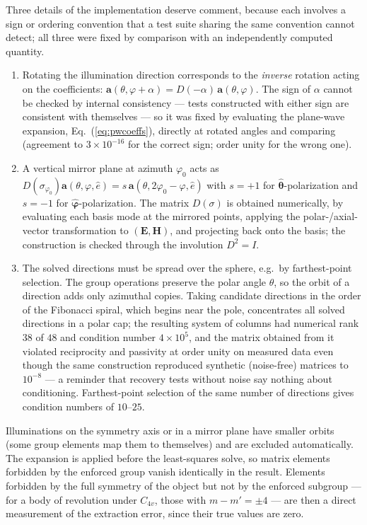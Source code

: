\documentclass[11pt]{article}
\newcommand{\EE}{\mathbf{E}}
\newcommand{\HH}{\mathbf{H}}
\newcommand{\thhat}{\hat{\boldsymbol{\theta}}}
\newcommand{\phhat}{\hat{\boldsymbol{\varphi}}}
\begin{document}
Three details of the implementation deserve comment, because each
involves a sign or ordering convention that a test suite sharing the
same convention cannot detect; all three were fixed by comparison with
an independently computed quantity.
\begin{enumerate}
\item Rotating the illumination direction corresponds to the
\emph{inverse} rotation acting on the coefficients:
$\mathbf{a}(\theta, \varphi + \alpha) = D(-\alpha)\,
\mathbf{a}(\theta, \varphi)$.  The sign of $\alpha$ cannot be checked
by internal consistency --- tests constructed with either sign are
consistent with themselves --- so it was fixed by evaluating the
plane-wave expansion, Eq.~(\ref{eq:pwcoeffs}), directly at rotated
angles and comparing (agreement to $3\times 10^{-16}$ for the correct
sign; order unity for the wrong one).
\item A vertical mirror plane at azimuth $\varphi_0$ acts as
$D(\sigma_{\varphi_0})\mathbf{a}(\theta,\varphi,\hat{e}) = s\,
\mathbf{a}(\theta, 2\varphi_0 - \varphi, \hat{e})$ with $s = +1$ for
$\thhat$-polarization and $s = -1$ for $\phhat$-polarization.  The
matrix $D(\sigma)$ is obtained numerically, by evaluating each basis
mode at the mirrored points, applying the polar-/axial-vector
transformation to $(\EE, \HH)$, and projecting back onto the basis;
the construction is checked through the involution $D^2 = I$.
\item The solved directions must be spread over the sphere, e.g.\ by
farthest-point selection.  The group operations preserve the polar
angle $\theta$, so the orbit of a direction adds only azimuthal
copies.  Taking candidate directions in the order of the Fibonacci
spiral, which begins near the pole, concentrates all solved directions
in a polar cap; the resulting system of columns had numerical rank
$38$ of $48$ and condition number $4\times 10^5$, and the matrix
obtained from it violated reciprocity and passivity at order unity on
measured data even though the same construction reproduced synthetic
(noise-free) matrices to $10^{-8}$ --- a reminder that recovery tests
without noise say nothing about conditioning.  Farthest-point
selection of the same number of directions gives condition numbers of
$10$--$25$.
\end{enumerate}
Illuminations on the symmetry axis or in a mirror plane have smaller
orbits (some group elements map them to themselves) and are excluded
automatically.  The expansion is applied before the least-squares
solve, so matrix elements forbidden by the enforced group vanish
identically in the result.  Elements forbidden by the full symmetry of
the object but not by the enforced subgroup --- for a body of
revolution under $C_{4v}$, those with $m - m' = \pm 4$ --- are then a
direct measurement of the extraction error, since their true values
are zero.
\end{document}
